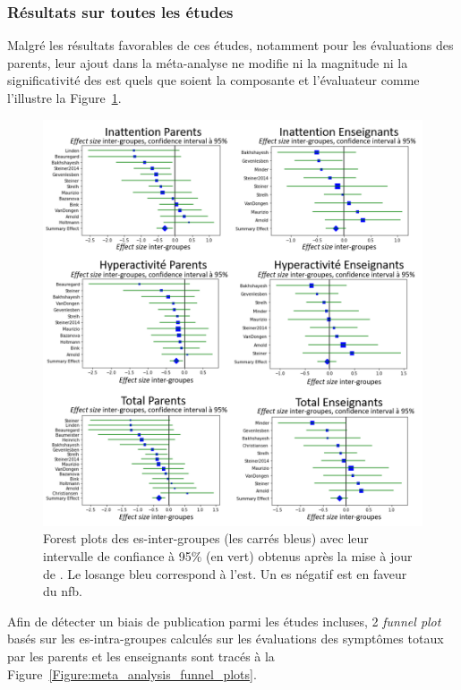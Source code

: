 \subsubsection{Résultats sur toutes les études}

Malgré les résultats favorables de ces études, notamment pour les évaluations des parents, leur ajout dans la méta-analyse ne modifie ni la magnitude
ni la significativité des \gls{est} quels que soient la composante et l'évaluateur comme l'illustre la Figure~\ref{Figure:meta_analysis_forest_plots}.

\begin{figure}[h!]
  \centering
	\includegraphics[width=1\linewidth]{figures/chapter-2/meta-analysis-forest-plots} 
  \caption{Forest plots des \gls{es}-inter-groupes (les carrés bleus) avec leur intervalle de confiance à 95\% (en vert) obtenus après la mise à jour de 
	\citet{Cortese2016}. Le losange bleu correspond à l'\gls{est}.
	Un \gls{es} négatif est en faveur du \gls{nfb}.}
  \label{Figure:meta_analysis_forest_plots}
\end{figure}

Afin de détecter un biais de publication parmi les études incluses, 2 \textit{funnel plot} basés sur les \gls{es}-intra-groupes calculés sur les évaluations
des symptômes totaux par les parents et les enseignants sont tracés à la Figure~\ref{Figure:meta_analysis_funnel_plots}. 


